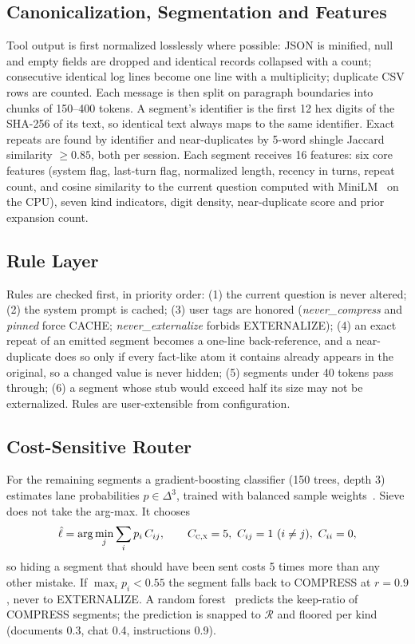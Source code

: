 \documentclass[journal]{IEEEtran}
\begin{document}
\subsection{Canonicalization, Segmentation and Features}
Tool output is first normalized losslessly where possible: JSON is minified, null and empty fields are dropped and identical records
collapsed with a count; consecutive identical log lines become one line with a multiplicity; duplicate CSV rows are counted. Each
message is then split on paragraph boundaries into chunks of 150--400 tokens. A segment's identifier is the first
12 hex digits of the SHA-256 of its text, so identical text always maps to the same identifier. Exact repeats are found by
identifier and near-duplicates by 5-word shingle Jaccard similarity $\ge 0.85$, both per session. Each segment receives 16
features: six core features (system flag, last-turn flag, normalized length, recency in turns, repeat count, and cosine similarity
to the current question computed with MiniLM~\cite{wang2020minilm} on the CPU), seven kind indicators, digit density,
near-duplicate score and prior expansion count.

\subsection{Rule Layer}
Rules are checked first, in priority order: (1) the current question is never altered; (2) the system prompt is cached; (3) user
tags are honored (\textit{never\_compress} and \textit{pinned} force CACHE; \textit{never\_externalize} forbids EXTERNALIZE); (4) an
exact repeat of an emitted segment becomes a one-line back-reference, and a near-duplicate does so only if every fact-like atom it
contains already appears in the original, so a changed value is never hidden; (5) segments under 40 tokens pass through;
(6) a segment whose stub would exceed half its size may not be externalized. Rules are user-extensible from configuration.

\subsection{Cost-Sensitive Router}
For the remaining segments a gradient-boosting classifier (150 trees, depth 3)~\cite{friedman2001gbm} estimates lane probabilities
$p\in\Delta^3$, trained with balanced sample weights~\cite{he2009imbalanced}. Sieve does not take the arg-max. It chooses
\begin{equation}
\hat\ell=\arg\min_{j}\sum_{i} p_i\,C_{ij},\qquad C_{\textsc{c},\textsc{x}}=5,\ C_{ij}=1\ (i\ne j),\ C_{ii}=0,
\label{eq:cost}
\end{equation}
so hiding a segment that should have been sent costs 5 times more than any other mistake. If $\max_i p_i<0.55$
the segment falls back to COMPRESS at $r=0.9$, never to EXTERNALIZE. A random forest~\cite{breiman2001rf} predicts the keep-ratio
of COMPRESS segments; the prediction is snapped to $\mathcal{R}$ and floored per kind (documents 0.3, chat 0.4, instructions 0.9).
\end{document}
